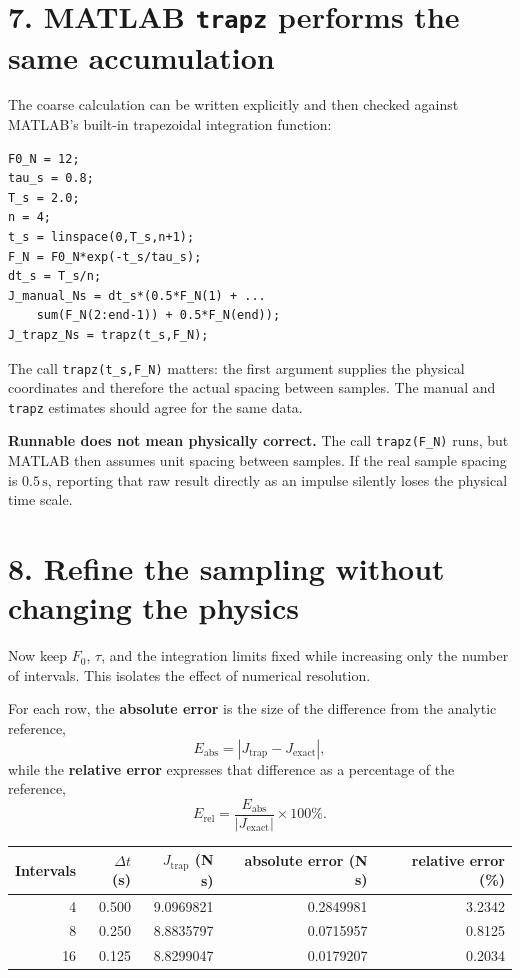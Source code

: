 \documentclass[11pt,a4paper]{article}
\newcommand{\units}[1]{\,\mathrm{#1}}
\begin{document}
\section*{7. MATLAB \texttt{trapz} performs the same accumulation}
The coarse calculation can be written explicitly and then checked against MATLAB's built-in trapezoidal integration function:
\begin{lstlisting}[style=matlabstyle,caption={Manual and built-in trapezoidal integration of the sampled force.}]
F0_N = 12;
tau_s = 0.8;
T_s = 2.0;
n = 4;
t_s = linspace(0,T_s,n+1);
F_N = F0_N*exp(-t_s/tau_s);
dt_s = T_s/n;
J_manual_Ns = dt_s*(0.5*F_N(1) + ...
    sum(F_N(2:end-1)) + 0.5*F_N(end));
J_trapz_Ns = trapz(t_s,F_N);
\end{lstlisting}

The call \texttt{trapz(t\_s,F\_N)} matters: the first argument supplies the physical coordinates and therefore the actual spacing between samples. The manual and \texttt{trapz} estimates should agree for the same data.

\begin{aibox}\textbf{Runnable does not mean physically correct.} The call \texttt{trapz(F\_N)} runs, but MATLAB then assumes unit spacing between samples. If the real sample spacing is $0.5\units{s}$, reporting that raw result directly as an impulse silently loses the physical time scale.\end{aibox}

\section*{8. Refine the sampling without changing the physics}
Now keep $F_0$, $\tau$, and the integration limits fixed while increasing only the number of intervals. This isolates the effect of numerical resolution.

For each row, the \textbf{absolute error} is the size of the difference from the analytic reference,
\[
E_{\mathrm{abs}}=\left|J_{\mathrm{trap}}-J_{\mathrm{exact}}\right|,
\]
while the \textbf{relative error} expresses that difference as a percentage of the reference,
\[
E_{\mathrm{rel}}=\frac{E_{\mathrm{abs}}}{\left|J_{\mathrm{exact}}\right|}\times100\%.
\]

\begin{center}\small
\begin{tabular}{rrrrr}
\toprule
Intervals & $\Delta t$ (s) & $J_{\mathrm{trap}}$ (N s) & absolute error (N s) & relative error (\%)\\
\midrule
4  & 0.500 & 9.0969821 & 0.2849981 & 3.2342\\
8  & 0.250 & 8.8835797 & 0.0715957 & 0.8125\\
16 & 0.125 & 8.8299047 & 0.0179207 & 0.2034\\
\bottomrule
\end{tabular}
\end{center}
\end{document}
